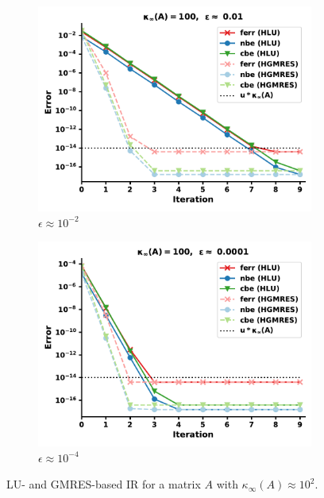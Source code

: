 \begin{figure}[h]
\centering
\begin{subfigure}{.5\textwidth}
  \centering
  \includegraphics[width=\linewidth]{chapters/5_experiments/figures/LR512e0_0.pdf}
  \caption{$\epsilon \approx 10^{-2}$}
  \label{fig:lrir1_1}
\end{subfigure}%
\begin{subfigure}{.5\textwidth}
  \centering
  \includegraphics[width=\linewidth]{chapters/5_experiments/figures/LR512e0_1.pdf}
  \caption{$\epsilon \approx 10^{-4}$}
  \label{fig:lrir1_2}
\end{subfigure}
\caption[Low-Rank IR 1]{LU- and GMRES-based IR for a matrix $A$ with $\kappa_\infty(A) \approx 10^2$.}
\label{fig:lrir1}
\end{figure}

